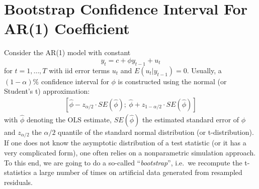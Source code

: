 \section[Bootstrap Confidence Interval For AR{(1)} Coefficient]{Bootstrap Confidence Interval For AR{(1)} Coefficient\label{ex:BootstrapConfidenceIntervalARone}}
Consider the AR{(1)} model with constant
\begin{equation*}
y_{t}=c +\phi y_{t-1}+u_{t}
\end{equation*}
for \(t=1,\ldots ,T\) with iid error terms \(u_{t}\) and \(E(u_{t}|y_{t-1})=0\).
Usually, a \( (1-\alpha)\% \) confidence interval for \( \phi \) is constructed using the normal (or Student's t) approximation:
\begin{gather*}
\left[ \hat{\phi}-z_{\alpha/2}\cdot SE(\hat{\phi});\ \hat{\phi}+z_{1-\alpha/2}\cdot SE(\hat{\phi})\right]
\end{gather*}
with \(\hat{\phi}\) denoting the OLS estimate,
  \(SE(\hat{\phi})\) the estimated standard error of \( \phi \)
  and \(z_{\alpha/2}\) the \(\alpha/2\) quantile of the standard normal distribution (or t-distribution).
If one does not know the asymptotic distribution of a test statistic
  (or it has a very complicated form),
  one often relies on a nonparametric simulation approach.
To this end, we are going to do a so-called \enquote{\emph{bootstrap}},
  i.e.\ we recompute the t-statistics a large number of times on artificial data
  generated from resampled residuals.

